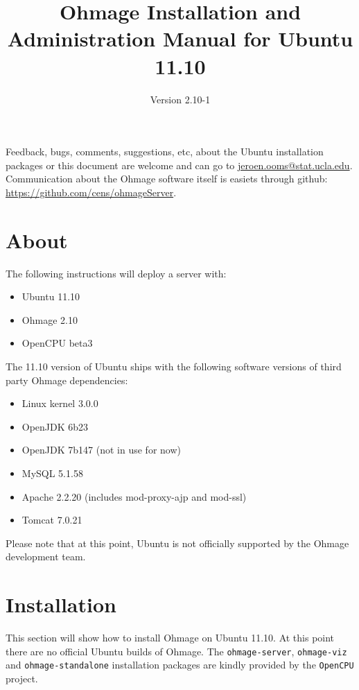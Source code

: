 \documentclass{scrartcl}
\title{Ohmage Installation and Administration Manual for Ubuntu 11.10}
\subtitle{Version 2.10-1}
\begin{document}
\maketitle

\noindent Feedback, bugs, comments, suggestions, etc, about the Ubuntu
installation packages or this document are welcome and can go to
\href{mailto:jeroen.ooms@stat.ucla.edu}{jeroen.ooms@stat.ucla.edu}.
Communication about the Ohmage software itself is easiets through github:
\href{https://github.com/cens/ohmageServer}{https://github.com/cens/ohmageServer}.


\section*{About}

The following instructions will deploy a server with:

\begin{itemize}
  \item Ubuntu 11.10
  \item Ohmage 2.10
  \item OpenCPU beta3
\end{itemize}

\noindent The 11.10 version of Ubuntu ships with the following
software versions of third party Ohmage dependencies:

\begin{itemize}
  \item Linux kernel 3.0.0
  \item OpenJDK 6b23
  \item OpenJDK 7b147 (not in use for now)
  \item MySQL 5.1.58
  \item Apache 2.2.20 (includes mod-proxy-ajp and mod-ssl)
  \item Tomcat 7.0.21
\end{itemize}

\noindent Please note that at this point, Ubuntu is not officially
supported by the Ohmage development team.

\section{Installation}

This section will show how to install Ohmage on Ubuntu 11.10. At this
point there are no official Ubuntu builds of Ohmage. The
\texttt{ohmage-server}, \texttt{ohmage-viz} and \texttt{ohmage-standalone} installation packages are kindly provided by the \texttt{OpenCPU} project.
\end{document}
